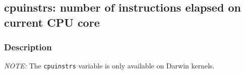 \clearpage
{}
{}
\label{vars:cpuinstrs}
\subsection*{cpuinstrs: number of instructions elapsed on current CPU core}

\subsubsection*{Description}

\emph{NOTE:} The \verb|cpuinstrs| variable is only available on Darwin
kernels.

